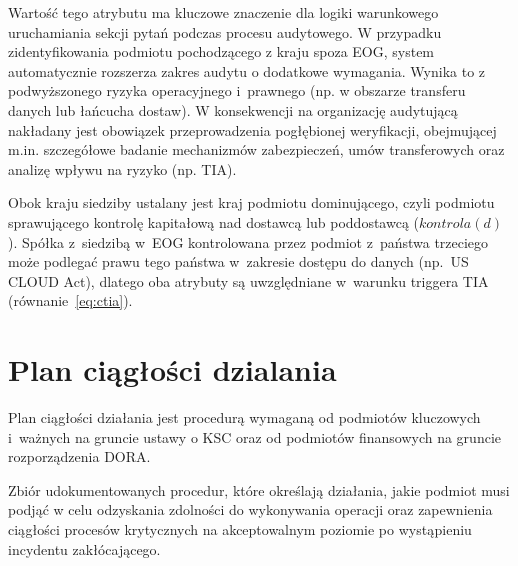 Wartość tego atrybutu ma kluczowe znaczenie dla logiki warunkowego uruchamiania sekcji pytań podczas procesu audytowego. W przypadku zidentyfikowania podmiotu pochodzącego z kraju spoza EOG, system automatycznie rozszerza zakres audytu o dodatkowe wymagania. Wynika to z podwyższonego ryzyka operacyjnego i~prawnego (np. w obszarze transferu danych lub łańcucha dostaw). W konsekwencji na organizację audytującą nakładany jest obowiązek przeprowadzenia pogłębionej weryfikacji, obejmującej m.in. szczegółowe badanie mechanizmów zabezpieczeń, umów transferowych oraz analizę wpływu na ryzyko (np. TIA).


Obok kraju siedziby ustalany jest kraj podmiotu dominującego, czyli podmiotu sprawującego kontrolę kapitałową nad dostawcą lub poddostawcą ($\textit{kontrola}(d)$). Spółka z~siedzibą w~EOG kontrolowana przez podmiot z~państwa trzeciego może podlegać prawu tego państwa w~zakresie dostępu do danych (np.\ US CLOUD Act), dlatego oba atrybuty są uwzględniane w~warunku triggera TIA (równanie~\eqref{eq:ctia}).

\begin{table}[H]
\centering %
\caption{Dopuszczalne wartości pochodzenia przedsiębiorstw }
\label{tab:country-values}

\end{table}

\section{Plan ciągłości dzialania}

Plan ciągłości działania jest procedurą wymaganą od podmiotów kluczowych i~ważnych na gruncie ustawy o KSC\autocite{uksc2026} oraz od podmiotów finansowych na gruncie rozporządzenia DORA\autocite{dora2022}.

\begin{definition}
Zbiór udokumentowanych procedur, które określają działania, jakie podmiot musi podjąć w celu odzyskania zdolności do wykonywania operacji oraz zapewnienia ciągłości procesów krytycznych na akceptowalnym poziomie po wystąpieniu incydentu zakłócającego.
\end{definition}

